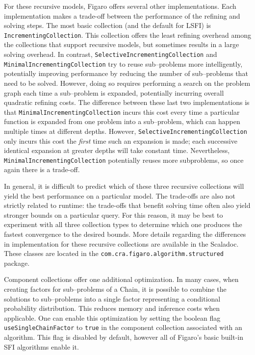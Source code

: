 For these recursive models, Figaro offers several other implementations. Each implementation makes a trade-off between the performance of the refining and solving steps. The most basic collection (and the default for LSFI) is \texttt{IncrementingCollection}. This collection offers the least refining overhead among the collections that support recursive models, but sometimes results in a large solving overhead. In contrast, \texttt{SelectiveIncrementingCollection} and \texttt{MinimalIncre\-mentingCollection} try to reuse sub--problems more intelligently, potentially improving performance by reducing the number of sub--problems that need to be solved. However, doing so requires performing a search on the problem graph each time a sub--problem is expanded, potentially incurring overall quadratic refining costs. The difference between these last two implementations is that \texttt{MinimalIncre\-mentingCollection} incurs this cost every time a particular function is expanded from one problem into a sub--problem, which can happen multiple times at different depths. However, \texttt{SelectiveIncrementing\-Collection} only incurs this cost the \textit{first} time such an expansion is made; each successive identical expansion at greater depths will take constant time. Nevertheless, \texttt{MinimalIncrementingCollection} potentially reuses more subproblems, so once again there is a trade-off.

In general, it is difficult to predict which of these three recursive collections will yield the best performance on a particular model. The trade-offs are also not strictly related to runtime: the trade-offs that benefit solving time often also yield stronger bounds on a particular query. For this reason, it may be best to experiment with all three collection types to determine which one produces the fastest convergence to the desired bounds. More details regarding the differences in implementation for these recursive collections are available in the Scaladoc. These classes are located in the \texttt{com.cra.figaro.algorithm.\-structured} package.

Component collections offer one additional optimization. In many cases, when creating factors for sub--problems of a Chain, it is possible to combine the solutions to sub--problems into a single factor representing a conditional probability distribution. This reduces memory and inference costs when applicable. One can enable this optimization by setting the boolean flag \texttt{useSingleChainFactor} to \texttt{true} in the component collection associated with an algorithm. This flag is disabled by default, however all of Figaro's basic built-in SFI algorithms enable it.

